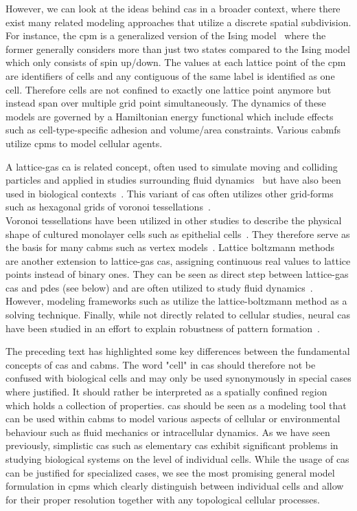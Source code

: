 However, we can look at the ideas behind \acp{ca} in a broader context, where there exist many
related modeling approaches that utilize a discrete spatial subdivision.
For instance, the \acl{cpm} is a generalized version of the Ising model~\cite{Ising1925} where the
former generally considers more than just two states compared to the Ising model which only consists
of spin up/down.
The values at each lattice point of the \ac{cpm} are identifiers of cells and any contiguous of the
same label is identified as one cell.
Therefore cells are not confined to exactly one lattice point anymore but instead span over multiple
grid point simultaneously.
The dynamics of these models are governed by a Hamiltonian energy functional which include
effects such as cell-type-specific adhesion and volume/area constraints.
Various \acp{cabmf}~\cite{Tanaka2015,Swat2012} utilize \acp{cpm} to model cellular agents.

A lattice-gas \acl{ca} is related concept, often used to simulate moving and colliding particles and
applied in studies surrounding fluid dynamics~\cite{Hardy1973} but have also been used in biological
contexts~\cite{Deutsch2005}.
This variant of \acp{ca} often utilizes other grid-forms such as hexagonal grids of voronoi
tessellations~\cite{Voronoi1908}.\\
Voronoi tessellations have been utilized in other studies to describe the physical shape of cultured
monolayer cells such as epithelial cells~\cite{Honda1978}.
They therefore serve as the basis for many \acp{cabm} such as vertex
models~\cite{Barton2017,Merks2011,Cooper2020}.
Lattice boltzmann methods~\cite{Chen1998} are another extension to lattice-gas \acp{ca}, assigning
continuous real values to lattice points instead of binary ones.
They can be seen as direct step between lattice-gas \acp{ca} and \acp{pde} (see below) and are often
utilized to study fluid dynamics~\cite{McNamara1988,Qian1992}.
However, modeling frameworks such as \citet{Tanaka2015} utilize the lattice-boltzmann method as a
solving technique.
Finally, while not directly related to cellular studies, neural \acp{ca} have been studied in an
effort to explain robustness of pattern formation~\cite{Mordvintsev2020}.

The preceding text has highlighted some key differences between the fundamental concepts of \acp{ca}
and \acp{cabm}.
The word "cell" in \acp{ca} should therefore not be confused with biological cells and may only be
used synonymously in special cases where justified.
It should rather be interpreted as a spatially confined region which holds a collection of
properties.
\acp{ca} should be seen as a modeling tool that can be used within \acp{cabm} to model various
aspects of cellular or environmental behaviour such as fluid mechanics or intracellular dynamics.
As we have seen previously, simplistic \acp{ca} such as elementary \acp{ca} exhibit significant
problems in studying biological systems on the level of individual cells.
While the usage of \acp{ca} can be justified for specialized cases, we see the most promising
general model formulation in \acp{cpm} which clearly distinguish between individual cells and allow
for their proper resolution together with any topological cellular processes.

